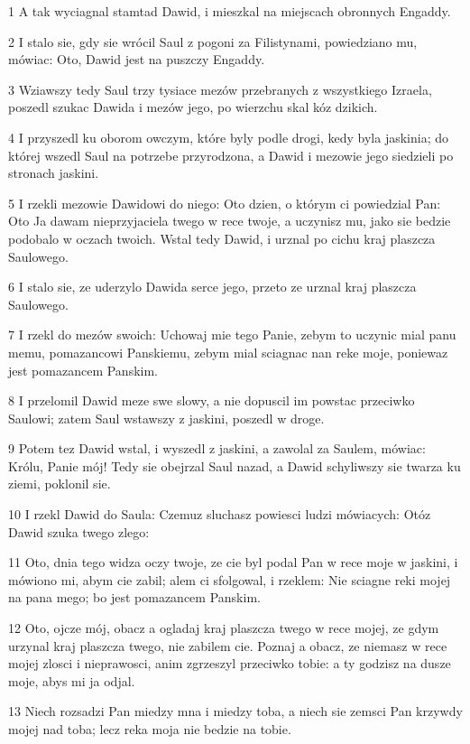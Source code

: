 \par 1 A tak wyciagnal stamtad Dawid, i mieszkal na miejscach obronnych Engaddy.
\par 2 I stalo sie, gdy sie wrócil Saul z pogoni za Filistynami, powiedziano mu, mówiac: Oto, Dawid jest na puszczy Engaddy.
\par 3 Wziawszy tedy Saul trzy tysiace mezów przebranych z wszystkiego Izraela, poszedl szukac Dawida i mezów jego, po wierzchu skal kóz dzikich.
\par 4 I przyszedl ku oborom owczym, które byly podle drogi, kedy byla jaskinia; do której wszedl Saul na potrzebe przyrodzona, a Dawid i mezowie jego siedzieli po stronach jaskini.
\par 5 I rzekli mezowie Dawidowi do niego: Oto dzien, o którym ci powiedzial Pan: Oto Ja dawam nieprzyjaciela twego w rece twoje, a uczynisz mu, jako sie bedzie podobalo w oczach twoich. Wstal tedy Dawid, i urznal po cichu kraj plaszcza Saulowego.
\par 6 I stalo sie, ze uderzylo Dawida serce jego, przeto ze urznal kraj plaszcza Saulowego.
\par 7 I rzekl do mezów swoich: Uchowaj mie tego Panie, zebym to uczynic mial panu memu, pomazancowi Panskiemu, zebym mial sciagnac nan reke moje, poniewaz jest pomazancem Panskim.
\par 8 I przelomil Dawid meze swe slowy, a nie dopuscil im powstac przeciwko Saulowi; zatem Saul wstawszy z jaskini, poszedl w droge.
\par 9 Potem tez Dawid wstal, i wyszedl z jaskini, a zawolal za Saulem, mówiac: Królu, Panie mój! Tedy sie obejrzal Saul nazad, a Dawid schyliwszy sie twarza ku ziemi, poklonil sie.
\par 10 I rzekl Dawid do Saula: Czemuz sluchasz powiesci ludzi mówiacych: Otóz Dawid szuka twego zlego:
\par 11 Oto, dnia tego widza oczy twoje, ze cie byl podal Pan w rece moje w jaskini, i mówiono mi, abym cie zabil; alem ci sfolgowal, i rzeklem: Nie sciagne reki mojej na pana mego; bo jest pomazancem Panskim.
\par 12 Oto, ojcze mój, obacz a ogladaj kraj plaszcza twego w rece mojej, ze gdym urzynal kraj plaszcza twego, nie zabilem cie. Poznaj a obacz, ze niemasz w rece mojej zlosci i nieprawosci, anim zgrzeszyl przeciwko tobie: a ty godzisz na dusze moje, abys mi ja odjal.
\par 13 Niech rozsadzi Pan miedzy mna i miedzy toba, a niech sie zemsci Pan krzywdy mojej nad toba; lecz reka moja nie bedzie na tobie.
